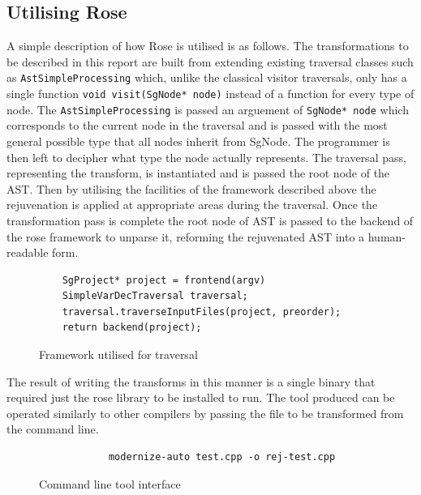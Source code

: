 \documentclass[bsc,frontabs,singlespacing,twoside,parskip,deptreport]{infthesis}
\begin{document}
\subsection{Utilising Rose} \label{UTIL_ROSE}

A simple description of how Rose is utilised is as follows. The transformations to be described in this report are built from extending existing traversal classes such as  \texttt{AstSimpleProcessing} \cite{ROSE_MANUAL} which, unlike the classical visitor traversals, only has a single function \texttt{void visit(SgNode* node)} instead of a function for every type of node. The \texttt{AstSimpleProcessing} is passed an arguement of \texttt{SgNode* node} which corresponds to the current node in the traversal and is passed with the most general possible type that all nodes inherit from SgNode. The programmer is then left to decipher what type the node actually represents. The traversal pass, representing the transform, is instantiated and is passed the root node of the AST. Then by utilising the facilities of the framework described above the rejuvenation is applied at appropriate areas during the traversal. Once the transformation pass is complete the root node of AST is passed to the backend of the rose framework to unparse it, reforming the rejuvenated AST into a human-readable form.    

\begin{figure}[!h]
    \centering
    \begin{verbatim}
    SgProject* project = frontend(argv)
    SimpleVarDecTraversal traversal;
    traversal.traverseInputFiles(project, preorder);
    return backend(project);
    \end{verbatim}
    \caption{Framework utilised for traversal}
    \label{fig:trav-proj}
\end{figure}

The result of writing the transforms in this manner is a single binary that required just the rose library to be installed to run. The tool produced can be operated similarly to other compilers by passing the file to be transformed from the command line.

\begin{figure}[!h]
    \centering
    \begin{verbatim}
            modernize-auto test.cpp -o rej-test.cpp
    \end{verbatim}
    \caption{Command line tool interface}
    \label{fig:cmd-opt}
\end{figure}
\end{document}
